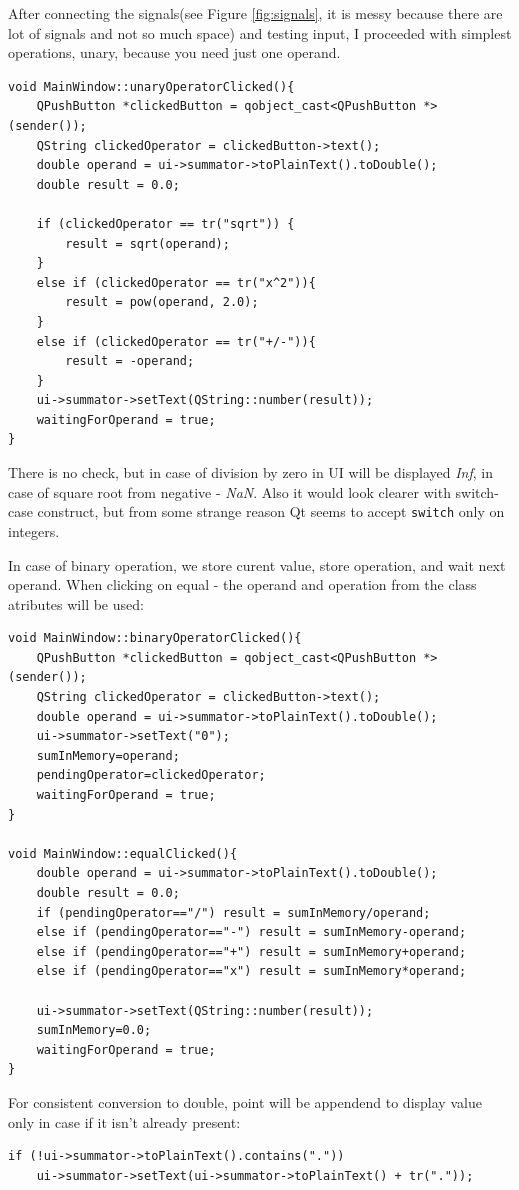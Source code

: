 After connecting the signals(see Figure \ref{fig:signals}, it is messy because there are lot of signals and not so much space) 
 and testing input, I proceeded with simplest operations, unary, because you need just one operand.
\begin{verbatim}
void MainWindow::unaryOperatorClicked(){
    QPushButton *clickedButton = qobject_cast<QPushButton *>(sender());
    QString clickedOperator = clickedButton->text();
    double operand = ui->summator->toPlainText().toDouble();
    double result = 0.0;

    if (clickedOperator == tr("sqrt")) {
        result = sqrt(operand);
    }
    else if (clickedOperator == tr("x^2")){
        result = pow(operand, 2.0);
    }
    else if (clickedOperator == tr("+/-")){
        result = -operand;
    }
    ui->summator->setText(QString::number(result));
    waitingForOperand = true;
}
\end{verbatim}
There is no check, but in case of division by zero in UI will be displayed \emph{Inf}, in case of square root from negative - \emph{NaN}.
Also it would look clearer with switch-case construct, but from some strange reason Qt seems to accept \texttt{switch} only on integers.

In case of binary operation, we store curent value, store operation, and wait next operand. When clicking on equal - the 
operand and operation from the class atributes will be used:
\begin{verbatim}
void MainWindow::binaryOperatorClicked(){
    QPushButton *clickedButton = qobject_cast<QPushButton *>(sender());
    QString clickedOperator = clickedButton->text();
    double operand = ui->summator->toPlainText().toDouble();
    ui->summator->setText("0");
    sumInMemory=operand;
    pendingOperator=clickedOperator;
    waitingForOperand = true;
}

void MainWindow::equalClicked(){
    double operand = ui->summator->toPlainText().toDouble();
    double result = 0.0;
    if (pendingOperator=="/") result = sumInMemory/operand;
    else if (pendingOperator=="-") result = sumInMemory-operand;
    else if (pendingOperator=="+") result = sumInMemory+operand;
    else if (pendingOperator=="x") result = sumInMemory*operand;

    ui->summator->setText(QString::number(result));
    sumInMemory=0.0;
    waitingForOperand = true;
}
\end{verbatim}

For consistent conversion to double, point will be appendend to display value only in case if it isn't already present:
\begin{verbatim}
if (!ui->summator->toPlainText().contains("."))
    ui->summator->setText(ui->summator->toPlainText() + tr("."));
\end{verbatim}


